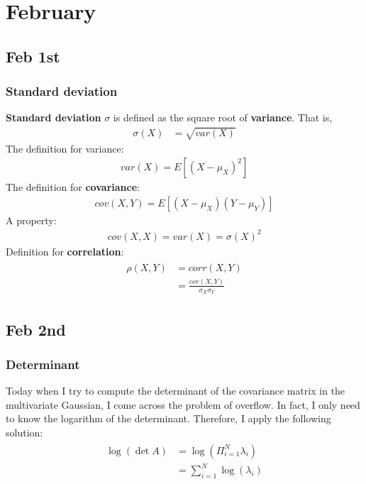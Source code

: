 \chapter{February}

\section{Feb 1st}
\subsection{Standard deviation}
\textbf{Standard deviation} $\sigma$ is defined as the square root of \textbf{variance}. That is,
\begin{align}
	\sigma(X) &= \sqrt{var(X)}
\end{align}
The definition for variance:
\begin{align}
var(X) = E[(X - \mu_X)^2]
\end{align}
The definition for \textbf{covariance}:
\begin{align}
cov(X,Y) = E[(X - \mu_X)(Y- \mu_Y)]
\end{align}
A property:
\begin{align}
	cov(X,X) = var(X) = \sigma(X)^2 
\end{align}
Definition for \textbf{correlation}:
\begin{align}
	\begin{split}
	\rho(X,Y) & = corr(X, Y) 		\\
			  & = \frac{cov(X,Y)}{\sigma_X \sigma_Y}
	\end{split}
\end{align}

\section{Feb 2nd}

\subsection{Determinant}
Today when I try to compute the determinant of the covariance matrix in the multivariate Gaussian, I come across the problem of overflow. In fact, I only
need to know the logarithm of the determinant. Therefore, I apply the following solution:
\begin{align}
	\begin{split}
	\log(\det A) &= \log(\Pi_{i=1}^{N} \lambda_i)  \\
				 & = \sum_{i=1}^{N} \log(\lambda_i)
	\end{split}
\end{align}